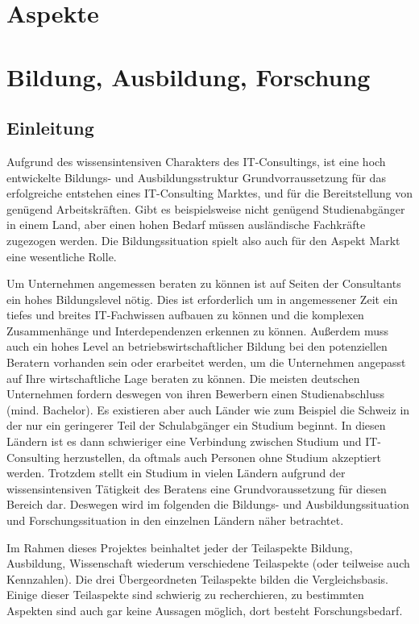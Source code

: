 \chapter{Aspekte}




\chapter{Bildung, Ausbildung, Forschung}

\section{Einleitung}
Aufgrund des wissensintensiven Charakters des IT-Consultings, ist eine hoch entwickelte Bildungs- und Ausbildungsstruktur Grundvorraussetzung für das erfolgreiche entstehen eines IT-Consulting Marktes, und für die Bereitstellung von genügend Arbeitskräften. 
Gibt es beispielsweise nicht genügend Studienabgänger in einem Land, aber einen hohen Bedarf müssen ausländische Fachkräfte zugezogen werden. Die Bildungssituation spielt also auch für den Aspekt Markt eine wesentliche Rolle.

Um Unternehmen angemessen beraten zu können ist auf Seiten der Consultants ein hohes Bildungslevel nötig. Dies ist erforderlich um in angemessener Zeit ein tiefes und breites IT-Fachwissen aufbauen zu können und die komplexen Zusammenhänge und Interdependenzen erkennen zu können. Außerdem muss auch ein hohes Level an betriebswirtschaftlicher Bildung bei den potenziellen Beratern vorhanden sein oder erarbeitet werden, um die Unternehmen angepasst auf Ihre wirtschaftliche Lage beraten zu können.
Die meisten deutschen Unternehmen fordern deswegen von ihren Bewerbern einen Studienabschluss (mind. Bachelor). Es existieren aber auch Länder wie zum Beispiel die Schweiz in der nur ein geringerer Teil der Schulabgänger ein Studium beginnt. In diesen Ländern ist es dann schwieriger eine Verbindung zwischen Studium und IT-Consulting herzustellen, da oftmals auch Personen ohne Studium akzeptiert werden.
Trotzdem stellt ein Studium in vielen Ländern aufgrund der wissensintensiven Tätigkeit des Beratens eine Grundvoraussetzung für diesen Bereich dar.
Deswegen wird im folgenden die Bildungs- und Ausbildungssituation und Forschungssituation in den einzelnen Ländern näher betrachtet.

Im Rahmen dieses Projektes beinhaltet jeder der Teilaspekte Bildung, Ausbildung, Wissenschaft wiederum verschiedene Teilaspekte (oder teilweise auch Kennzahlen). Die drei Übergeordneten Teilaspekte bilden die Vergleichsbasis. Einige dieser Teilaspekte sind schwierig zu recherchieren, zu bestimmten Aspekten sind auch gar keine Aussagen möglich, dort besteht Forschungsbedarf. 

